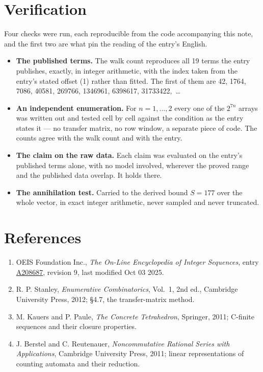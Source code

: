 \documentclass[11pt]{article}
\theoremstyle{definition}
\begin{document}
\section{Verification}

Four checks were run, each reproducible from the code accompanying this note, and the first two are what pin the reading of the entry's English.

\begin{itemize}

\item {\bfseries The published terms.} The walk count reproduces all 19 terms the entry publishes, exactly, in integer arithmetic, with the index taken from the entry's stated offset (1) rather than fitted. The first of them are 42, 1764, 7086, 40581, 269766, 1346961, 6398617, 31733422,~\dots

\item {\bfseries An independent enumeration.} For $n = 1,\dots,2$ every one of the $2^{7n}$ arrays was written out and tested cell by cell against the condition as the entry states it --- no transfer matrix, no row window, a separate piece of code. The counts agree with the walk count and with the entry.

\item {\bfseries The claim on the raw data.} Each claim was evaluated on the entry's published terms alone, with no model involved, wherever the proved range and the published data overlap. It holds there.

\item {\bfseries The annihilation test.} Carried to the derived bound $S = 177$ over the whole vector, in exact integer arithmetic, never sampled and never truncated.

\end{itemize}

\section{References}

\begin{enumerate}

\item OEIS Foundation Inc., \emph{The On-Line Encyclopedia of Integer Sequences}, entry \href{https://oeis.org/A208687}{A208687}, revision 9, last modified Oct 03 2025.

\item R. P. Stanley, \emph{Enumerative Combinatorics}, Vol.~1, 2nd ed., Cambridge University Press, 2012; \S4.7, the transfer-matrix method.

\item M. Kauers and P. Paule, \emph{The Concrete Tetrahedron}, Springer, 2011; C-finite sequences and their closure properties.

\item J. Berstel and C. Reutenauer, \emph{Noncommutative Rational Series with Applications}, Cambridge University Press, 2011; linear representations of counting automata and their reduction.

\end{enumerate}
\end{document}

